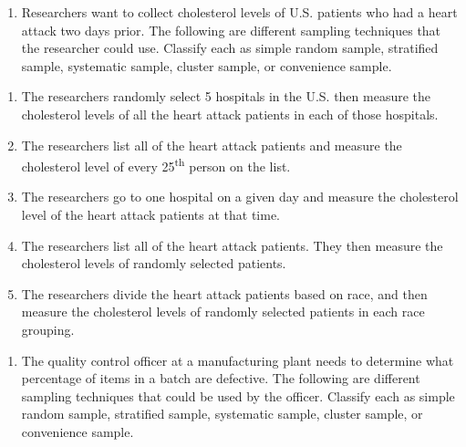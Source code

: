 \documentclass[]{book}
\providecommand{\tightlist}{%
  \setlength{\itemsep}{0pt}\setlength{\parskip}{0pt}}
\begin{document}
\begin{enumerate}
\def\labelenumi{\arabic{enumi}.}
\tightlist
\item
  Researchers want to collect cholesterol levels of U.S. patients who had a heart attack two days prior. The following are different sampling techniques that the researcher could use. Classify each as simple random sample, stratified sample, systematic sample, cluster sample, or convenience sample.
\end{enumerate}

\begin{enumerate}
\def\labelenumi{\alph{enumi}.}
\tightlist
\item
  The researchers randomly select 5 hospitals in the U.S. then measure the cholesterol levels of all the heart attack patients in each of those hospitals.
\item
  The researchers list all of the heart attack patients and measure the cholesterol level of every 25\textsuperscript{th} person on the list.
\item
  The researchers go to one hospital on a given day and measure the cholesterol level of the heart attack patients at that time.
\item
  The researchers list all of the heart attack patients. They then measure the cholesterol levels of randomly selected patients.
\item
  The researchers divide the heart attack patients based on race, and then measure the cholesterol levels of randomly selected patients in each race grouping.
\end{enumerate}

\begin{enumerate}
\def\labelenumi{\arabic{enumi}.}
\setcounter{enumi}{1}
\tightlist
\item
  The quality control officer at a manufacturing plant needs to
  determine what percentage of items in a batch are defective. The
  following are different sampling techniques that could be used by
  the officer. Classify each as simple random sample, stratified
  sample, systematic sample, cluster sample, or convenience sample.
\end{enumerate}
\end{document}
